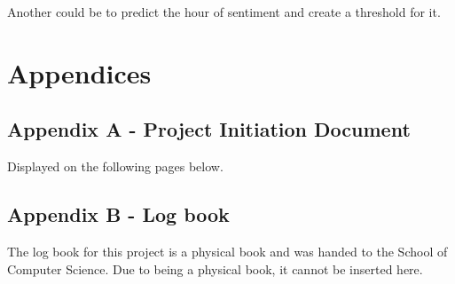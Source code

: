 \documentclass[oneside, 12pt]{article}
\begin{document}
		Another could be to predict the hour of sentiment and create a threshold for it.
		
	\newpage
	
	\nocite{*}
	\printbibliography
	
	\newpage
	\section{Appendices}
		\subsection{Appendix A - Project Initiation Document}
		Displayed on the following pages below.
		
		\subsection{Appendix B - Log book}
		The log book for this project is a physical book and was handed to the School of Computer Science. Due to being a physical book, it cannot be inserted here.
	
\end{document}
